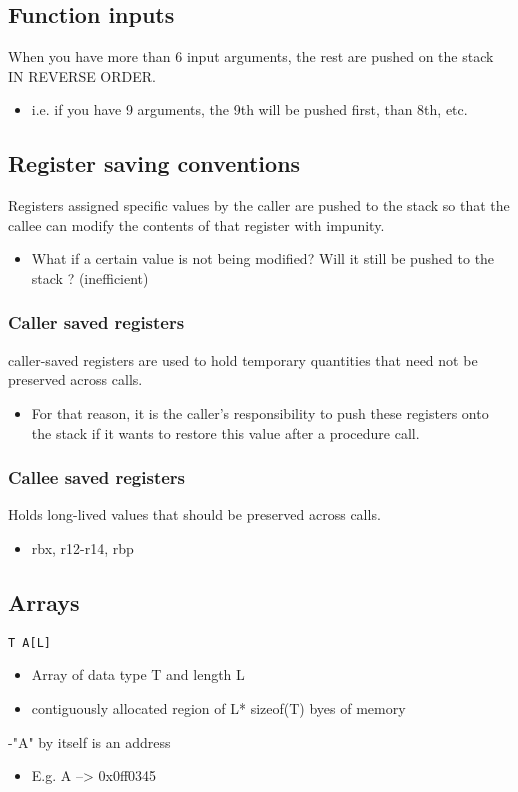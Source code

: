 \documentclass[11pt]{article}
\begin{document}
\subsection{Function inputs}
\label{sec-9-2}
When you have more than 6 input arguments, the rest are pushed on the stack IN REVERSE ORDER. 
\begin{itemize}
\item i.e. if you have 9 arguments, the 9th will be pushed first, than 8th, etc.
\end{itemize}
\subsection{Register saving conventions}
\label{sec-9-3}
Registers assigned specific values by the caller are pushed to the stack so that the callee
can modify the contents of that register with impunity.
\begin{itemize}
\item What if a certain value is not being modified? Will it still be pushed to the stack ? (inefficient)
\end{itemize}
\subsubsection{Caller saved registers}
\label{sec-9-3-1}
caller-saved registers are used to hold temporary quantities that need not be preserved
across calls.
\begin{itemize}
\item For that reason, it is the caller's responsibility to push these registers onto
the stack if it wants to restore this value after a procedure call.
\end{itemize}
\subsubsection{Callee saved registers}
\label{sec-9-3-2}
Holds long-lived values that should be preserved across calls.
\begin{itemize}
\item rbx, r12-r14, rbp
\end{itemize}
\subsection{Arrays}
\label{sec-9-4}
\texttt{T A[L]}
\begin{itemize}
\item Array of data type T and length L
\item contiguously allocated region of L* sizeof(T) byes of memory
\end{itemize}
-"A"  by itself is an address
\begin{itemize}
\item E.g. A --> 0x0ff0345
\end{itemize}
\end{document}
